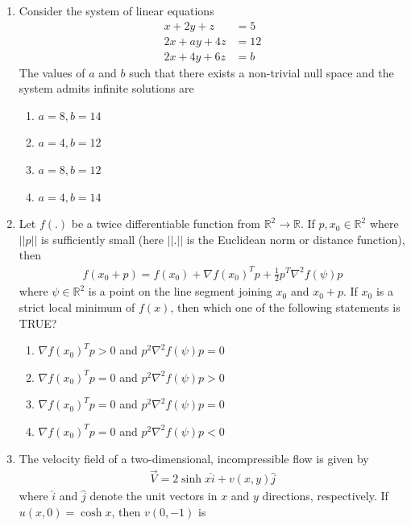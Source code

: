 \documentclass[journal,11pt,onecolumn]{IEEEtran}
\begin{document}
\begin{enumerate}[resume]
    \item Consider the system of linear equations
          \begin{align}
              x + 2y + z   & = 5  \\
              2x + ay + 4z & = 12 \\
              2x + 4y + 6z & = b
          \end{align}
          The values of $a$ and $b$ such that there exists a non-trivial null space and the system admits infinite solutions are

          \begin{enumerate}
              \item $a = 8, b = 14$
              \item $a = 4, b = 12$
              \item $a = 8, b = 12$
              \item $a = 4, b = 14$
          \end{enumerate}

    \item Let $f(.)$ be a twice differentiable function from $\mathbb{R}^2 \to \mathbb{R}$. If $p, x_0 \in \mathbb{R}^2$ where $||p||$ is sufficiently small (here $||.||$ is the Euclidean norm or distance function), then
          \begin{align}
              f(x_0 + p) = f(x_0) + \nabla f(x_0)^T p + \frac{1}{2} p^T \nabla^2 f(\psi) p
          \end{align}
          where $\psi \in \mathbb{R}^2$ is a point on the line segment joining $x_0$ and $x_0 + p$. If $x_0$ is a strict local minimum of $f(x)$, then which one of the following statements is TRUE?

          \begin{enumerate}
              \item $\nabla f(x_0)^T p > 0$ and $p^2\nabla^2 f(\psi)p = 0$
              \item $\nabla f(x_0)^T p = 0$ and $p^2\nabla^2 f(\psi)p > 0$
              \item $\nabla f(x_0)^T p = 0$ and $p^2\nabla^2 f(\psi)p = 0$
              \item $\nabla f(x_0)^T p = 0$ and $p^2\nabla^2 f(\psi)p < 0$
          \end{enumerate}

    \item The velocity field of a two-dimensional, incompressible flow is given by
          \begin{align}
              \vec{V} = 2\sinh x \hat{i} + v(x,y) \hat{j}
          \end{align}
          where $\hat{i}$ and $\hat{j}$ denote the unit vectors in $x$ and $y$ directions, respectively. If $u(x,0) = \cosh x$, then $v(0,-1)$ is


\end{enumerate}
\end{document}
